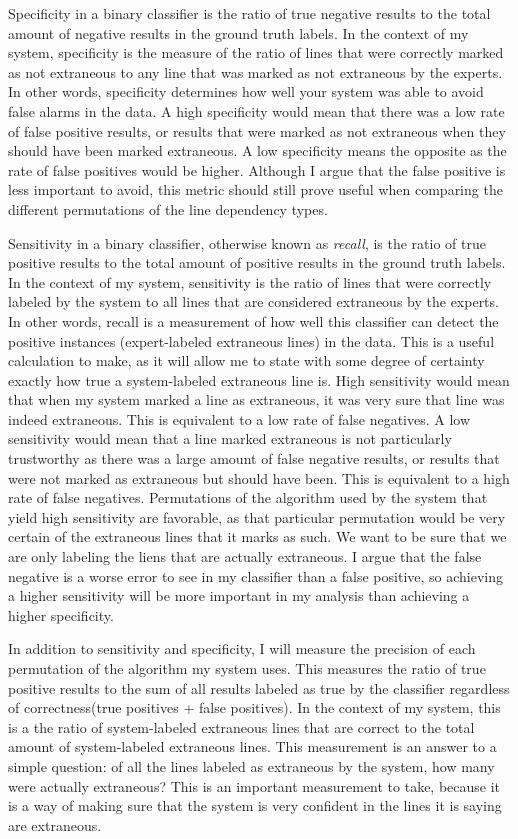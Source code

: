 \documentclass[draft]{article}
\begin{document}
Specificity in a binary classifier is the ratio of true negative results to the total amount of negative results in the ground truth labels. In the context of my system, specificity is the measure of the ratio of lines that were correctly marked as not extraneous to any line that was marked as not extraneous by the experts. In other words, specificity determines how well your system was able to avoid false alarms in the data. A high specificity would mean that there was a low rate of false positive results, or results that were marked as not extraneous when they should have been marked extraneous. A low specificity means the opposite as the rate of false positives would be higher. Although I argue that the false positive is less important to avoid, this metric should still prove useful when comparing the different permutations of the line dependency types.

Sensitivity in a binary classifier, otherwise known as \emph{recall}, is the ratio of true positive results to the total amount of positive results in the ground truth labels. In the context of my system, sensitivity is the ratio of lines that were correctly labeled by the system to all lines that are considered extraneous by the experts. In other words, recall is a measurement of how well this classifier can detect the positive instances (expert-labeled extraneous lines) in the data. This is a useful calculation to make, as it will allow me to state with some degree of certainty exactly how true a system-labeled extraneous line is. High sensitivity would mean that when my system marked a line as extraneous, it was very sure that line was indeed extraneous. This is equivalent to a low rate of false negatives. A low sensitivity would mean that a line marked extraneous is not particularly trustworthy as there was a large amount of false negative results, or results that were not marked as extraneous but should have been. This is equivalent to a high rate of false negatives. Permutations of the algorithm used by the system that yield high sensitivity are favorable, as that particular permutation would be very certain of the extraneous lines that it marks as such. We want to be sure that we are only labeling the liens that are actually extraneous. I argue that the false negative is a worse error to see in my classifier than a false positive, so achieving a higher sensitivity will be more important in my analysis than achieving a higher specificity.

In addition to sensitivity and specificity, I will measure the precision of each permutation of the algorithm my system uses. This measures the ratio of true positive results to the sum of all results labeled as true by the classifier regardless of correctness(true positives + false positives). In the context of my system, this is a the ratio of system-labeled extraneous lines that are correct to the total amount of system-labeled extraneous lines. This measurement is an answer to a simple question: of all the lines labeled as extraneous by the system, how many were actually extraneous? This is an important measurement to take, because it is a way of making sure that the system is very confident in the lines it is saying are extraneous.
\end{document}
